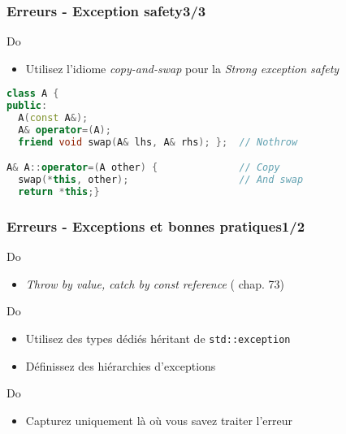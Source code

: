 \documentclass[C++.tex]{subfiles}
\begin{document}
\begin{frame}[fragile]
	\frametitle{Erreurs - Exception safety\titlehfill{}3/3}
	\begin{exampleblock}{Do}
		\begin{itemize}
			\item Utilisez l'idiome \textit{copy-and-swap} pour la \textit{Strong exception safety}
		\end{itemize}
	\end{exampleblock}


	\pause 

	\begin{lstlisting}[language=C++]
class A {
public:
  A(const A&);
  A& operator=(A);
  friend void swap(A& lhs, A& rhs); };  // Nothrow

A& A::operator=(A other) {              // Copy
  swap(*this, other);                   // And swap
  return *this;}\end{lstlisting}
\end{frame}

\begin{frame}
	\frametitle{Erreurs - Exceptions et bonnes pratiques\titlehfill{}1/2}
	\begin{exampleblock}{Do}
		\begin{itemize}
			\item \textit{Throw by value, catch by const reference} (\cite{coding} chap. 73)
		\end{itemize}
	\end{exampleblock}

	\begin{exampleblock}{Do}
		\begin{itemize}
			\item Utilisez des types dédiés héritant de \lstinline|std::exception|


			\item Définissez des hiérarchies d'exceptions
		\end{itemize}
	\end{exampleblock}

	\begin{exampleblock}{Do}
		\begin{itemize}
			\item Capturez uniquement là où vous savez traiter l'erreur
		\end{itemize}
	\end{exampleblock}
\end{frame}
\end{document}
